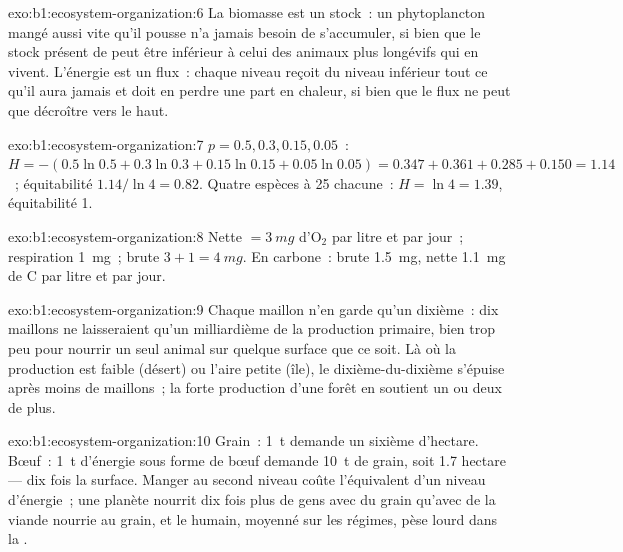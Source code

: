 \begin{solution}{exo:b1:ecosystem-organization:6}
La biomasse est un stock~: un phytoplancton mangé aussi vite qu'il
pousse n'a jamais besoin de s'accumuler, si bien que le stock présent
de  peut être inférieur à celui des animaux plus
longévifs qui en vivent. L'énergie est un flux~: chaque niveau reçoit du
niveau inférieur tout ce qu'il aura jamais et doit en perdre une part
en chaleur, si bien que le flux ne peut que décroître vers le haut.
\end{solution}

\begin{solution}{exo:b1:ecosystem-organization:7}
$p = 0.5, 0.3, 0.15, 0.05$~: $H = -(0.5\ln 0.5 + 0.3\ln 0.3 + 0.15\ln
0.15 + 0.05\ln 0.05) = 0.347 + 0.361 + 0.285 + 0.150 = 1.14$~;
équitabilité $1.14/\ln 4 = 0.82$. Quatre espèces à 25 chacune~: $H = \ln 4 = 1.39$,
équitabilité 1.
\end{solution}

\begin{solution}{exo:b1:ecosystem-organization:8}
Nette $= \qty{3}{mg}$ d'$\mathrm{O_2}$ par litre et par jour~;
respiration \qty{1}{mg}~; brute $3 + 1 = \qty{4}{mg}$. En carbone~: brute
\qty{1.5}{mg}, nette \qty{1.1}{mg} de C par litre et par jour.
\end{solution}

\begin{solution}{exo:b1:ecosystem-organization:9}
Chaque maillon n'en garde qu'un dixième~: dix maillons ne laisseraient
qu'un milliardième de la production primaire, bien trop peu pour
nourrir un seul animal sur quelque surface que ce soit. Là où la
production est faible (désert) ou l'aire petite (île), le
dixième-du-dixième s'épuise après moins de maillons~; la forte
production d'une forêt en soutient un ou deux de plus.
\end{solution}

\begin{solution}{exo:b1:ecosystem-organization:10}
Grain~: \qty{1}{t} demande un sixième d'hectare. Bœuf~: \qty{1}{t}
d'énergie sous forme de bœuf demande \qty{10}{t} de grain, soit
\num{1.7} hectare --- dix fois la surface. Manger au second niveau coûte
l'équivalent d'un niveau d'énergie~; une planète nourrit dix fois plus
de gens avec du grain qu'avec de la viande nourrie au grain, et le
 humain, moyenné sur les régimes, pèse lourd dans la
.
\end{solution}


